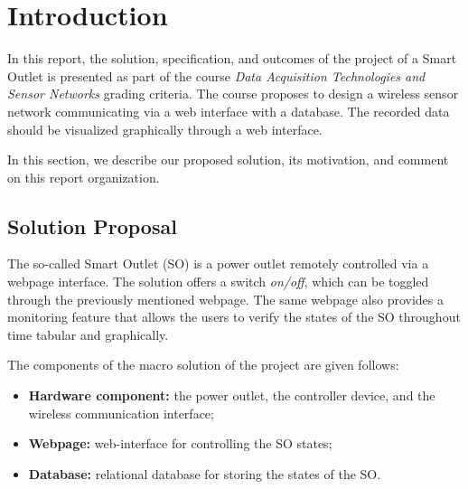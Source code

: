 %
%
%
%


\section{Introduction}
\label{sec:intro}

In this report, the solution, specification, and outcomes of the project of a
Smart Outlet is presented as part of the course \textit{Data Acquisition
Technologies and Sensor Networks} grading criteria. The course proposes to
design a wireless sensor network communicating via a web interface with a
database. The recorded data should be visualized graphically through a
web interface.

In this section, we describe our proposed solution, its motivation, and comment
on this report organization.

\subsection{Solution Proposal}

The so-called Smart Outlet (SO) is a power outlet remotely controlled via a webpage
interface. The solution offers a switch \textit{on/off}, which can be toggled
through the previously mentioned webpage. The same webpage also provides a
monitoring feature that allows the users to verify the states of the SO
throughout time tabular and graphically.

The components of the macro solution of the project are given follows:

\begin{itemize}
    \item \textbf{Hardware component:} the power outlet, the controller device,
    and the wireless communication interface;
    \item \textbf{Webpage:} web-interface for controlling the SO states;
    \item \textbf{Database:} relational database for storing the states of the SO.
\end{itemize}

